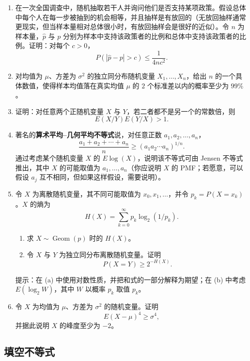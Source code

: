 \documentclass[UTF8,12pt,a4paper,fontset=fandol]{ctexart}
\begin{document}
\begin{enumerate}
  \item 在一次全国调查中，随机抽取若干人并询问他们是否支持某项政策。假设总体中每个人在每一步被抽到的机会相等，并且抽样是有放回的（无放回抽样通常更现实，但当样本量相对总体很小时，有放回抽样会是很好的近似）。令 $n$ 为样本量，$\hat p$ 与 $p$ 分别为样本中支持该政策者的比例和总体中支持该政策者的比例。证明：对每个 $c>0$，
  \[
    P(|\hat p-p|>c)\le \frac{1}{4nc^2}.
  \]

  \item 对均值为 $\mu$、方差为 $\sigma^2$ 的独立同分布随机变量 $X_1,\ldots,X_n$，给出 $n$ 的一个具体数值，使得样本均值落在真实均值 $\mu$ 的 $2$ 个标准差以内的概率至少为 $99\%$。

  \item 证明：对任意两个正随机变量 $X$ 与 $Y$，若二者都不是另一个的常数倍，则
  \[
    E(X/Y)E(Y/X)>1.
  \]

  \item 著名的\textbf{算术平均--几何平均不等式}说，对任意正数 $a_1,a_2,\ldots,a_n$，
  \[
    \frac{a_1+a_2+\cdots+a_n}{n}\ge (a_1a_2\cdots a_n)^{1/n}.
  \]
  通过考虑某个随机变量 $X$ 的 $E\log(X)$，说明该不等式可由 Jensen 不等式推出，其中 $X$ 的可能取值为 $a_1,\ldots,a_n$（你应说明 $X$ 的 PMF；若愿意，可以假设 $a_j$ 互不相同，但如果这样假设，需要说明）。

  \item 令 $X$ 为离散随机变量，其不同可能取值为 $x_0,x_1,\ldots$，并令 $p_k=P(X=x_k)$。$X$ 的熵为
  \[
    H(X)=\sum_{k=0}^{\infty}p_k\log_2(1/p_k).
  \]
  \begin{enumerate}
    \item 求 $X\sim\operatorname{Geom}(p)$ 时的 $H(X)$。
    \item 令 $X$ 与 $Y$ 为独立同分布离散随机变量。证明
    \[
      P(X=Y)\ge 2^{-H(X)}.
    \]
  \end{enumerate}
  提示：在 (a) 中使用对数性质，并把和式的一部分解释为期望；在 (b) 中考虑 $E(\log_2 W)$，其中 $W$ 以概率 $p_k$ 取值 $p_k$。

  \item 令 $X$ 为均值为 $\mu$、方差为 $\sigma^2$ 的随机变量。证明
  \[
    E(X-\mu)^4\ge \sigma^4,
  \]
  并据此说明 $X$ 的峰度至少为 $-2$。
\end{enumerate}

\subsection*{填空不等式}
\end{document}
